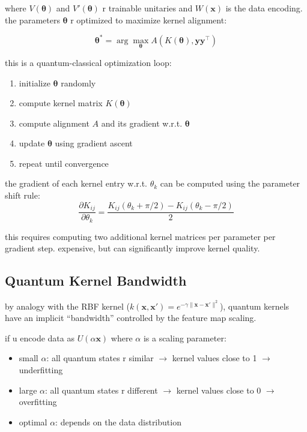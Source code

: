 \documentclass[11pt,a4paper]{article}
\theoremstyle{definition}
\theoremstyle{remark}
\begin{document}
where $V(\boldsymbol{\theta})$ and $V'(\boldsymbol{\theta})$ r trainable unitaries and $W(\mathbf{x})$ is the data encoding. the parameters $\boldsymbol{\theta}$ r optimized to maximize kernel alignment:

\[
\boldsymbol{\theta}^* = \arg\max_{\boldsymbol{\theta}} A(K(\boldsymbol{\theta}), \mathbf{y}\mathbf{y}^\top)
\]

this is a quantum-classical optimization loop:
\begin{enumerate}[leftmargin=*]
    \item initialize $\boldsymbol{\theta}$ randomly
    \item compute kernel matrix $K(\boldsymbol{\theta})$
    \item compute alignment $A$ and its gradient w.r.t. $\boldsymbol{\theta}$
    \item update $\boldsymbol{\theta}$ using gradient ascent
    \item repeat until convergence
\end{enumerate}

the gradient of each kernel entry w.r.t. $\theta_k$ can be computed using the parameter shift rule:
\[
\frac{\partial K_{ij}}{\partial \theta_k} = \frac{K_{ij}(\theta_k + \pi/2) - K_{ij}(\theta_k - \pi/2)}{2}
\]

this requires computing two additional kernel matrices per parameter per gradient step. expensive, but can significantly improve kernel quality.

\subsection{Quantum Kernel Bandwidth}

by analogy with the RBF kernel ($k(\mathbf{x}, \mathbf{x}') = e^{-\gamma\|\mathbf{x} - \mathbf{x}'\|^2}$), quantum kernels have an implicit ``bandwidth'' controlled by the feature map scaling.

if u encode data as $U(\alpha \mathbf{x})$ where $\alpha$ is a scaling parameter:
\begin{itemize}[leftmargin=*]
    \item small $\alpha$: all quantum states r similar $\to$ kernel values close to 1 $\to$ underfitting
    \item large $\alpha$: all quantum states r different $\to$ kernel values close to 0 $\to$ overfitting
    \item optimal $\alpha$: depends on the data distribution
\end{itemize}
\end{document}
